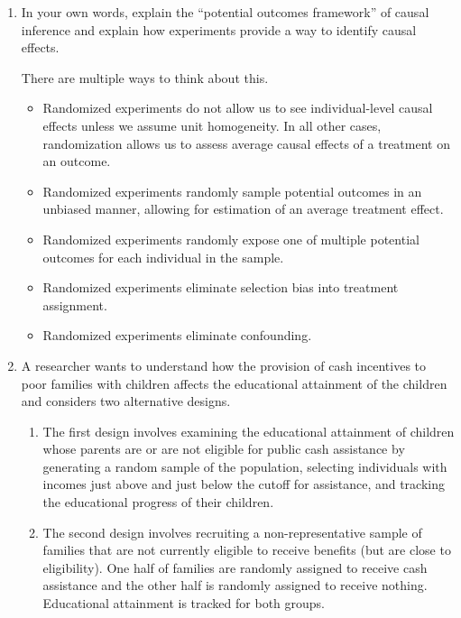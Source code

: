 \documentclass[a4paper,12pt]{exam}
\begin{document}
\begin{enumerate}
\item  In your own words, explain the ``potential outcomes framework'' of causal inference and explain how experiments provide a way to identify causal effects.

\begin{solution}

There are multiple ways to think about this.

\begin{itemize}
\item Randomized experiments do not allow us to see individual-level causal effects unless we assume unit homogeneity. In all other cases, randomization allows us to assess average causal effects of a treatment on an outcome.
\item Randomized experiments randomly sample potential outcomes in an unbiased manner, allowing for estimation of an average treatment effect.
\item Randomized experiments randomly expose one of multiple potential outcomes for each individual in the sample.
\item Randomized experiments eliminate selection bias into treatment assignment.
\item Randomized experiments eliminate confounding.
\end{itemize}

\end{solution}

\item A researcher wants to understand how the provision of cash incentives to poor families with children affects the educational attainment of the children and considers two alternative designs.

\begin{enumerate}
\item The first design involves examining the educational attainment of children whose parents are or are not eligible for public cash assistance by generating a random sample of the population, selecting individuals with incomes just above and just below the cutoff for assistance, and tracking the educational progress of their children.
\item The second design involves recruiting a non-representative sample of families that are not currently eligible to receive benefits (but are close to eligibility). One half of families are randomly assigned to receive cash assistance and the other half is randomly assigned to receive nothing. Educational attainment is tracked for both groups.
\end{enumerate}


\end{enumerate}
\end{document}
